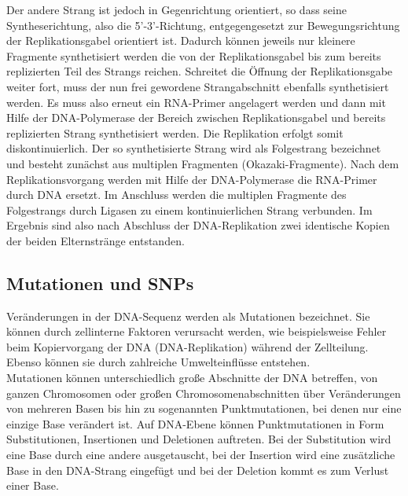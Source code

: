 Der andere Strang ist jedoch in Gegenrichtung orientiert, so dass seine Syntheserichtung, also die 5'-3'-Richtung, entgegengesetzt zur Bewegungsrichtung der Replikationsgabel orientiert ist. Dadurch können jeweils nur kleinere Fragmente synthetisiert werden die von der Replikationsgabel bis zum bereits replizierten Teil des Strangs reichen. Schreitet die Öffnung der Replikationsgabe weiter fort, muss der nun frei gewordene Strangabschnitt ebenfalls synthetisiert werden. Es muss also erneut ein RNA-Primer angelagert werden und dann mit Hilfe der DNA-Polymerase der Bereich zwischen Replikationsgabel und bereits replizierten Strang synthetisiert werden. Die Replikation erfolgt somit diskontinuierlich. Der so synthetisierte Strang wird als Folgestrang bezeichnet und besteht zunächst aus multiplen Fragmenten (Okazaki-Fragmente). Nach dem Replikationsvorgang werden mit Hilfe der DNA-Polymerase die RNA-Primer durch DNA ersetzt. Im Anschluss werden die multiplen Fragmente des Folgestrangs durch Ligasen zu einem kontinuierlichen Strang verbunden. Im Ergebnis sind also nach Abschluss der DNA-Replikation zwei identische Kopien der beiden Elternstränge entstanden.\\

\subsection{Mutationen und SNPs} \label{subsec:mutation}

Veränderungen in der DNA-Sequenz werden als Mutationen bezeichnet. Sie können durch zellinterne Faktoren verursacht werden, wie beispielsweise Fehler beim Kopiervorgang der DNA (DNA-Replikation) während der Zellteilung. Ebenso können sie durch zahlreiche Umwelteinflüsse entstehen. \\

Mutationen können unterschiedlich große Abschnitte der DNA betreffen, von ganzen Chromosomen oder großen Chromosomenabschnitten über Veränderungen von mehreren Basen bis hin zu sogenannten Punktmutationen, bei denen nur eine einzige Base verändert ist. Auf DNA-Ebene können Punktmutationen in Form Substitutionen, Insertionen und Deletionen auftreten. Bei der Substitution wird eine Base durch eine andere ausgetauscht, bei der Insertion wird eine zusätzliche Base in den DNA-Strang eingefügt und bei der Deletion kommt es zum Verlust einer Base. \\

